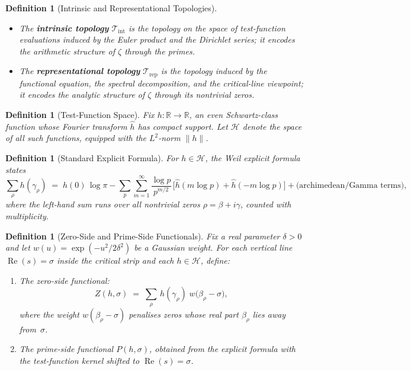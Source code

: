 \documentclass[11pt]{article}
\newtheorem{definition}[theorem]{Definition}
\theoremstyle{remark}
\DeclareMathOperator{\Rea}{Re}
\begin{document}
\begin{definition}[Intrinsic and Representational Topologies]
\label{def:dual-topologies}
\mbox{}
\begin{itemize}
\item The \textbf{intrinsic topology} $\mathcal{T}_{\mathrm{int}}$ is the
  topology on the space of test-function evaluations induced by the
  Euler product and the Dirichlet series; it encodes the arithmetic
  structure of $\zeta$ through the primes.
\item The \textbf{representational topology} $\mathcal{T}_{\mathrm{rep}}$ is
  the topology induced by the functional equation, the spectral
  decomposition, and the critical-line viewpoint; it encodes the
  analytic structure of $\zeta$ through its nontrivial zeros.
\end{itemize}
\end{definition}


\begin{definition}[Test-Function Space]
\label{def:test-functions}
Fix $h\colon\mathbb{R}\to\mathbb{R}$, an \emph{even} Schwartz-class
function whose Fourier transform $\hat{h}$ has compact support.
Let $\mathcal{H}$ denote the space of all such functions,
equipped with the $L^{2}$-norm $\lVert h\rVert$.
\end{definition}


\begin{definition}[Standard Explicit Formula]
\label{def:explicit-formula}
For $h\in\mathcal{H}$, the Weil explicit formula states
\[
  \sum_{\rho} h(\gamma_{\rho})
  \;=\;
  \widehat{h}(0)\,\log\pi
  - \sum_{p}\sum_{m=1}^{\infty}
    \frac{\log p}{p^{m/2}}\,
    \bigl[\hat{h}(m\log p) + \hat{h}(-m\log p)\bigr]
  + \text{(archimedean/Gamma terms)},
\]
where the left-hand sum runs over all nontrivial zeros $\rho = \beta+i\gamma$,
counted with multiplicity.
\end{definition}


\begin{definition}[Zero-Side and Prime-Side Functionals]
\label{def:ZP-functionals}
Fix a real parameter $\delta > 0$ and let
$w(u) = \exp(-u^{2}/2\delta^{2})$ be a Gaussian weight.
For each vertical line $\Rea(s)=\sigma$ inside the critical strip
and each $h\in\mathcal{H}$, define:
\begin{enumerate}
\item[\textbf{(Z)}]
  The \emph{zero-side functional}:
  \[
    Z(h,\sigma)
    \;=\;
    \sum_{\rho}\, h(\gamma_{\rho})\;
    w\!\bigl(\beta_{\rho}-\sigma\bigr),
  \]
  where the weight $w(\beta_{\rho}-\sigma)$ penalises zeros whose
  real part $\beta_{\rho}$ lies away from~$\sigma$.

\item[\textbf{(P)}]
  The \emph{prime-side functional} $P(h,\sigma)$, obtained from the
  explicit formula with the test-function kernel shifted to
  $\Rea(s)=\sigma$.
\end{enumerate}
\end{definition}
\end{document}
